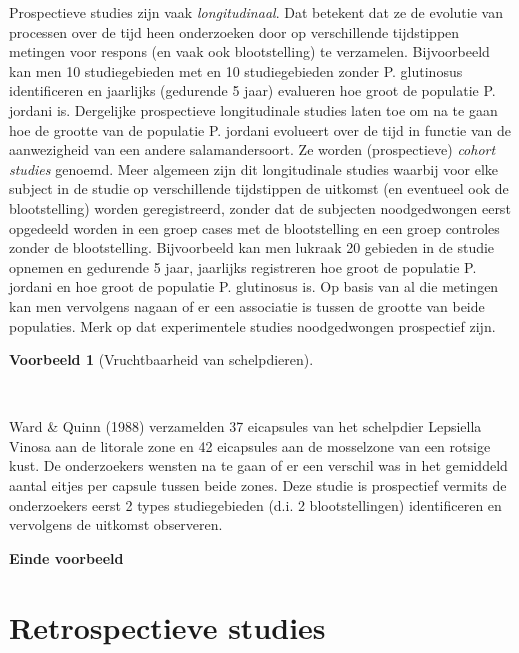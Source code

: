 \documentclass[
  dutch,
  letterpaper,
  12pt]{book}
\theoremstyle{definition}
\theoremstyle{definition}
\theoremstyle{definition}
\newtheorem{example}{Voorbeeld}[chapter]
\theoremstyle{remark}
\begin{document}
Prospectieve studies zijn vaak \emph{longitudinaal}. Dat betekent dat ze
de evolutie van processen over de tijd heen onderzoeken door op
verschillende tijdstippen metingen voor respons (en vaak ook
blootstelling) te verzamelen. Bijvoorbeeld kan men 10 studiegebieden met
en 10 studiegebieden zonder P. glutinosus identificeren en jaarlijks
(gedurende 5 jaar) evalueren hoe groot de populatie P. jordani is.
Dergelijke prospectieve longitudinale studies laten toe om na te gaan
hoe de grootte van de populatie P. jordani evolueert over de tijd in
functie van de aanwezigheid van een andere salamandersoort. Ze worden
(prospectieve) \emph{cohort studies} genoemd. Meer algemeen zijn dit
longitudinale studies waarbij voor elke subject in de studie op
verschillende tijdstippen de uitkomst (en eventueel ook de
blootstelling) worden geregistreerd, zonder dat de subjecten
noodgedwongen eerst opgedeeld worden in een groep cases met de
blootstelling en een groep controles zonder de blootstelling.
Bijvoorbeeld kan men lukraak 20 gebieden in de studie opnemen en
gedurende 5 jaar, jaarlijks registreren hoe groot de populatie P.
jordani en hoe groot de populatie P. glutinosus is. Op basis van al die
metingen kan men vervolgens nagaan of er een associatie is tussen de
grootte van beide populaties. Merk op dat experimentele studies
noodgedwongen prospectief zijn.

\begin{example}[Vruchtbaarheid van
schelpdieren]\protect\hypertarget{exm-vruchtbaarheid-van-schelpdieren}{}\label{exm-vruchtbaarheid-van-schelpdieren}

~

\end{example}

Ward \& Quinn (1988) verzamelden 37 eicapsules van het schelpdier
Lepsiella Vinosa aan de litorale zone en 42 eicapsules aan de mosselzone
van een rotsige kust. De onderzoekers wensten na te gaan of er een
verschil was in het gemiddeld aantal eitjes per capsule tussen beide
zones. Deze studie is prospectief vermits de onderzoekers eerst 2 types
studiegebieden (d.i. 2 blootstellingen) identificeren en vervolgens de
uitkomst observeren.

\textbf{Einde voorbeeld}

\section{Retrospectieve studies}\label{sec-design-retro}
\end{document}
